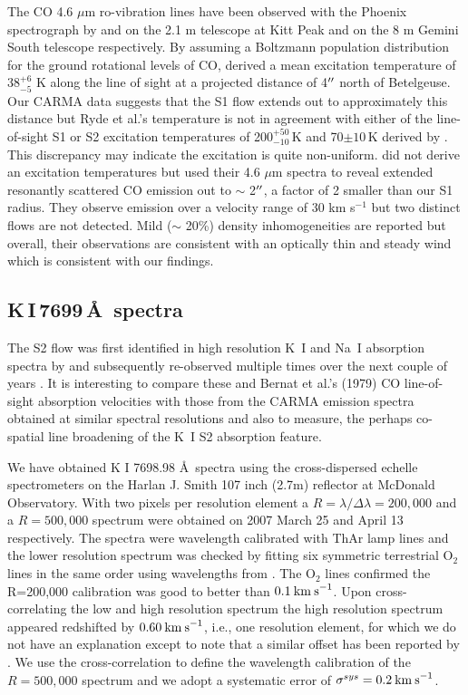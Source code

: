 \documentclass[iop]{emulateapj}
\begin{document}
The CO 4.6 $\mu$m ro-vibration lines have been observed with the Phoenix spectrograph \citep{1998SPIE.3354..810H} by \cite{1999A&A...347L..35R} and \cite{2009AJ....137.3558S} on the 2.1 m telescope at Kitt Peak and on the 8 m Gemini South telescope respectively. By assuming a Boltzmann population distribution for the ground rotational levels of CO, \cite{1999A&A...347L..35R}  derived a mean excitation temperature of 38${}^{+6}_{-5}$ K along the line of sight at a projected distance of 4$\mbox{$^{\prime\prime}$}$ north of Betelgeuse. Our CARMA data suggests that the S1 flow extends out to approximately this distance but Ryde et al.'s temperature is not in agreement with either of the line-of-sight S1 or S2 excitation temperatures of 200${}^{+50}_{-10}$\,K and 70$\pm 10$\,K derived by \cite{1979ApJ...233L.135B}. This discrepancy may indicate the excitation is quite non-uniform.
\cite{2009AJ....137.3558S} did not derive an excitation temperatures but used their 4.6 $\mu$m spectra to reveal extended resonantly scattered CO emission out to $\sim$ 2$\mbox{$^{\prime\prime}$}$, a factor of 2 smaller than our S1 radius. They observe emission over a velocity range of 30 km s${}^{-1}$ but two distinct flows are not detected. Mild ($\sim$ 20\%) density inhomogeneities are reported but overall, their observations are consistent with an optically thin and steady wind which is consistent with our findings.

\subsection{K\,I\,7699\,\AA \ spectra}

The S2 flow was first identified in high resolution K~I and Na~I absorption spectra by \cite{1975ApJ...199..427G} and subsequently re-observed multiple times over the next couple of years \citep{1979QJRAS..20..361G}. It is interesting to compare these and Bernat et al.'s (1979) CO
line-of-sight absorption velocities with those from the CARMA emission spectra obtained at similar spectral resolutions and also to measure, the perhaps co-spatial line broadening of the K~I S2 absorption feature.

We have obtained K I 7698.98 \AA \ spectra using the cross-dispersed echelle spectrometers on the Harlan J. Smith 107 inch (2.7m) reflector at McDonald Observatory. With two pixels per resolution element a $R=\lambda/\Delta\lambda=200,000$ and a $R=500,000$ spectrum were obtained on 2007 March 25 and April 13 respectively. The spectra were wavelength calibrated with ThAr lamp lines and the lower resolution spectrum was checked by fitting six symmetric terrestrial O${}_2$ lines in the same order using wavelengths from \cite{1948ApJ...108..167B}. The O${}_2$ lines confirmed the R=200,000 calibration was good to better than $0.1\>{\rm km\>s}^{-1}$. Upon cross-correlating the low and high resolution spectrum the high resolution spectrum appeared redshifted by $0.60\>{\rm km\>s}^{-1}$, i.e., one resolution element, for which we do not have an explanation except to note that a similar offset has been reported by \cite{1994ApJ...436..152W}. We use the cross-correlation to define the wavelength calibration of the $R=500,000$ spectrum and we adopt a systematic error of $\sigma^{sys}=0.2\>{\rm km\>s}^{-1}$.
\end{document}
